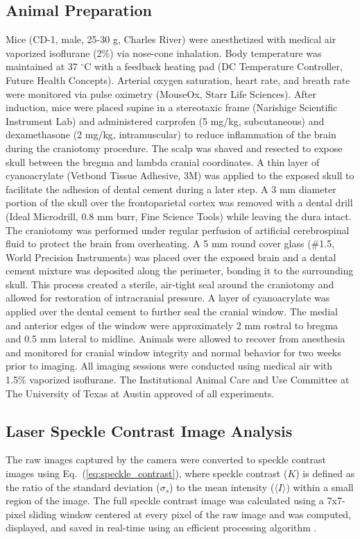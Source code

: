 \documentclass[12pt]{spieman}  %
\begin{document}
\begin{spacing}{2}
\subsection{Animal Preparation}
Mice (CD-1, male, 25-30 g, Charles River) were anesthetized with medical air vaporized isoflurane (2\%) via nose-cone inhalation. Body temperature was maintained at 37 $^\circ$C with a feedback heating pad (DC Temperature Controller, Future Health Concepts). Arterial oxygen saturation, heart rate, and breath rate were monitored via pulse oximetry (MouseOx, Starr Life Sciences). After induction, mice were placed supine in a stereotaxic frame (Narishige Scientific Instrument Lab) and administered carprofen (5 mg/kg, subcutaneous) and dexamethasone (2 mg/kg, intramuscular) to reduce inflammation of the brain during the craniotomy procedure. The scalp was shaved and resected to expose skull between the bregma and lambda cranial coordinates. A thin layer of cyanoacrylate (Vetbond Tissue Adhesive, 3M) was applied to the exposed skull to facilitate the adhesion of dental cement during a later step. A 3 mm diameter portion of the skull over the frontoparietal cortex was removed with a dental drill (Ideal Microdrill, 0.8 mm burr, Fine Science Tools) while leaving the dura intact. The craniotomy was performed under regular perfusion of artificial cerebrospinal fluid to protect the brain from overheating. A 5 mm round cover glass (\#1.5, World Precision Instruments) was placed over the exposed brain and a dental cement mixture was deposited along the perimeter, bonding it to the surrounding skull. This process created a sterile, air-tight seal around the craniotomy and allowed for restoration of intracranial pressure. A layer of cyanoacrylate was applied over the dental cement to further seal the cranial window. The medial and anterior edges of the window were approximately 2 mm rostral to bregma and 0.5 mm lateral to midline. Animals were allowed to recover from anesthesia and monitored for cranial window integrity and normal behavior for two weeks prior to imaging. All imaging sessions were conducted using medical air with 1.5\% vaporized isoflurane. The Institutional Animal Care and Use Committee at The University of Texas at Austin approved of all experiments.


\subsection{Laser Speckle Contrast Image Analysis}
The raw images captured by the camera were converted to speckle contrast images using Eq.~(\ref{eq:speckle_contrast}), where speckle contrast ($K$) is defined as the ratio of the standard deviation ($\sigma_{s}$) to the mean intensity ($\langle{I}\rangle$) within a small region of the image. The full speckle contrast image was calculated using a 7x7-pixel sliding window centered at every pixel of the raw image and was computed, displayed, and saved in real-time using an efficient processing algorithm \cite{Tom:2008tg}.


\end{spacing}
\end{document}
